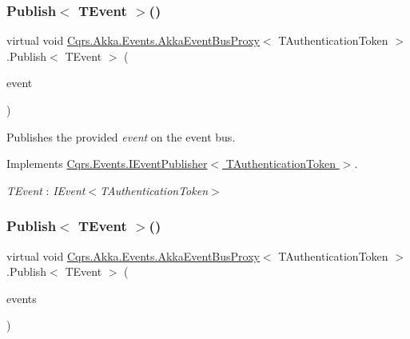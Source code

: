 \subsubsection{\texorpdfstring{Publish$<$ T\+Event $>$()}{Publish< TEvent >()}\hspace{0.1cm}{\footnotesize\ttfamily [1/2]}}
{\footnotesize\ttfamily virtual void \hyperlink{classCqrs_1_1Akka_1_1Events_1_1AkkaEventBusProxy}{Cqrs.\+Akka.\+Events.\+Akka\+Event\+Bus\+Proxy}$<$ T\+Authentication\+Token $>$.Publish$<$ T\+Event $>$ (\begin{DoxyParamCaption}\item[{T\+Event @}]{event }\end{DoxyParamCaption})\hspace{0.3cm}{\ttfamily [virtual]}}



Publishes the provided {\itshape event}  on the event bus. 



Implements \hyperlink{interfaceCqrs_1_1Events_1_1IEventPublisher_a02f0db0bc9b3aa1c7f766f58f8422ee3_a02f0db0bc9b3aa1c7f766f58f8422ee3}{Cqrs.\+Events.\+I\+Event\+Publisher$<$ T\+Authentication\+Token $>$}.

\begin{Desc}
\item[Type Constraints]\begin{description}
\item[{\em T\+Event} : {\em I\+Event$<$T\+Authentication\+Token$>$}]\end{description}
\end{Desc}
\mbox{\label{classCqrs_1_1Akka_1_1Events_1_1AkkaEventBusProxy_af4c202eaab00ed2fb6160d5b114d935c_af4c202eaab00ed2fb6160d5b114d935c}} 
\subsubsection{\texorpdfstring{Publish$<$ T\+Event $>$()}{Publish< TEvent >()}\hspace{0.1cm}{\footnotesize\ttfamily [2/2]}}
{\footnotesize\ttfamily virtual void \hyperlink{classCqrs_1_1Akka_1_1Events_1_1AkkaEventBusProxy}{Cqrs.\+Akka.\+Events.\+Akka\+Event\+Bus\+Proxy}$<$ T\+Authentication\+Token $>$.Publish$<$ T\+Event $>$ (\begin{DoxyParamCaption}\item[{I\+Enumerable$<$ T\+Event $>$}]{events }\end{DoxyParamCaption})\hspace{0.3cm}{\ttfamily [virtual]}}



